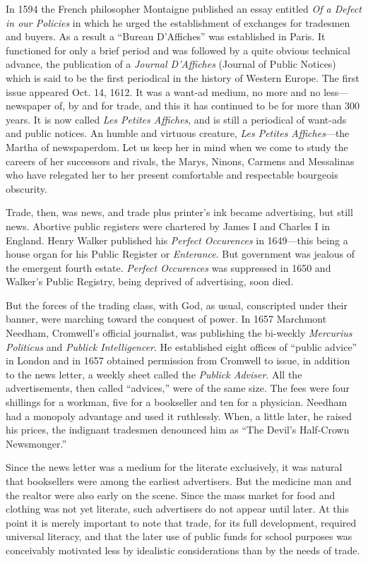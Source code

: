 \documentclass[twoside,nohyper,openany,nobib]{tufte-book}
\begin{document}
In 1594 the French philosopher Montaigne published an essay entitled
\emph{Of a Defect in our Policies} in which he urged the establishment
of exchanges for tradesmen and buyers. As a result a ``Bureau
D'Affiches'' was established in Paris. It functioned for only a brief
period and was followed by a quite obvious technical advance, the
publication of a \emph{Journal D'Affiches} (Journal of Public Notices)
which is said to be the first periodical in the history of Western
Europe. The first issue appeared Oct. 14, 1612. It was a want-ad medium,
no more and no less---newspaper of, by and for trade, and this it has
continued to be for more than 300 years. It is now called \emph{Les
Petites Affiches}, and is still a periodical of want-ads and public
notices. An humble and virtuous creature, \emph{Les Petites
Affiches}---the Martha of newspaperdom. Let us keep her in mind when we
come to study the careers of her successors and rivals, the Marys,
Ninons, Carmens and Messalinas who have relegated her to her present
comfortable and respectable bourgeois obscurity.

Trade, then, was news, and trade plus printer's ink became advertising,
but still news. Abortive public registers were chartered by James I and
Charles I in England. Henry Walker published his \emph{Perfect
Occurences} in 1649---this being a house organ for his Public Register
or \emph{Enterance}. But government was jealous of the emergent fourth
estate. \emph{Perfect Occurences} was suppressed in 1650 and Walker's
Public Registry, being deprived of advertising, soon died.

But the forces of the trading class, with God, as usual, conscripted
under their banner, were marching toward the conquest of power. In 1657
Marchmont Needham, Cromwell's official journalist, was publishing the
bi-weekly \emph{Mercurius Politicus} and \emph{Publick Intelligencer}.
He established eight offices of ``public advice'' in London and in 1657
obtained permission from Cromwell to issue, in addition to the news
letter, a weekly sheet called the \emph{Publick Adviser}. All the
advertisements, then called ``advices,'' were of the same size. The fees
were four shillings for a workman, five for a bookseller and ten for a
physician. Needham had a monopoly advantage and used it ruthlessly.
When, a little later, he raised his prices, the indignant tradesmen
denounced him as ``The Devil's Half-Crown Newsmonger.''

Since the news letter was a medium for the literate exclusively, it was
natural that booksellers were among the earliest advertisers. But the
medicine man and the realtor were also early on the scene. Since the
mass market for food and clothing was not yet literate, such advertisers
do not appear until later. At this point it is merely important to note
that trade, for its full development, required universal literacy, and
that the later use of public funds for school purposes was conceivably
motivated less by idealistic considerations than by the needs of trade.
\end{document}
